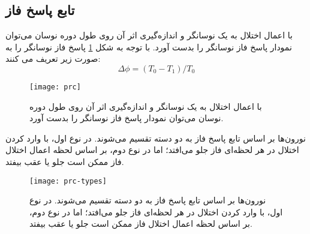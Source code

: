 \subsection{تابع پاسخ فاز}
با اعمال اختلال به یک نوسانگر و اندازه‌گیری اثر آن روی طول دوره نوسان می‌توان نمودار پاسخ فاز
 نوسانگر را بدست آورد. با توجه به شکل
 \ref{fig:prc}
پاسخ فاز نوسانگر را به صورت زیر تعریف می کنند:
\begin{equation}
\Delta \phi = (T_0 - T_1)/T_0
\label{eq:prc}
\end{equation}


\begin{figure}
	\centering
	\texttt{[image: prc]}
    \caption{
با اعمال اختلال به یک نوسانگر و اندازه‌گیری اثر آن روی طول دوره نوسان می‌توان نمودار پاسخ فاز نوسانگر را بدست آورد.
\label{fig:prc}
    }
\end{figure}

  نورون‌ها بر اساس تابع پاسخ فاز به دو دسته تقسیم می‌شوند. در نوع اول، با وارد کردن اختلال در هر لحظه‌ای فاز جلو می‌افتد؛ اما در نوع دوم، بر اساس لحظه اعمال اختلال فاز ممکن است جلو یا عقب بیفتد.
  
\begin{figure}
	\centering
	\texttt{[image: prc-types]}
    \caption{
  نورون‌ها بر اساس تابع پاسخ فاز به دو دسته تقسیم می‌شوند. در نوع اول، با وارد کردن اختلال در هر لحظه‌ای فاز جلو می‌افتد؛ اما در نوع دوم، بر اساس لحظه اعمال اختلال فاز ممکن است جلو یا عقب بیفتد.
    }
\end{figure}

  
  
  
  
  
  
  
  
  
  
  
  
  
  
  
  
  
  
  
  
  
  